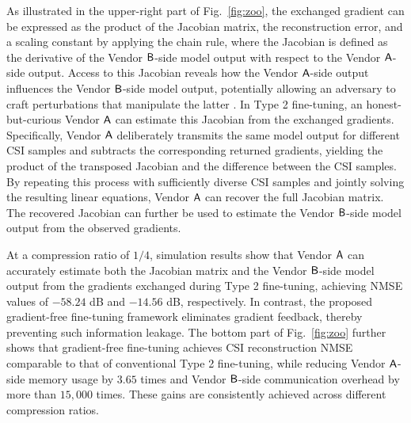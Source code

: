 \documentclass[10pt,twocolumn]{IEEEtran}
\begin{document}
As illustrated in the upper-right part of Fig.~\ref{fig:zoo}, the exchanged gradient can be expressed as the product of the Jacobian matrix, the reconstruction error, and a scaling constant by applying the chain rule, where the Jacobian is defined as the derivative of the Vendor ${\sf B}$-side model output with respect to the Vendor ${\sf A}$-side output. Access to this Jacobian reveals how the Vendor ${\sf A}$-side output influences the Vendor ${\sf B}$-side model output, potentially allowing an adversary to craft perturbations that manipulate the latter \cite{papernot2016limitations}. In Type 2 fine-tuning, an honest-but-curious Vendor ${\sf A}$ can estimate this Jacobian from the exchanged gradients. 
Specifically, Vendor ${\sf A}$ deliberately transmits the same model output for different CSI samples and subtracts the corresponding returned gradients, yielding the product of the transposed Jacobian and the difference between the CSI samples. By repeating this process with sufficiently diverse CSI samples and jointly solving the resulting linear equations, Vendor ${\sf A}$ can recover the full Jacobian matrix. The recovered Jacobian can further be used to estimate the Vendor ${\sf B}$-side model output from the observed gradients. 



%

At a compression ratio of $1/4$, simulation results show that Vendor ${\sf A}$ can accurately estimate both the Jacobian matrix and the Vendor ${\sf B}$-side model output from the gradients exchanged during Type 2 fine-tuning, achieving NMSE values of $-58.24$ dB and $-14.56$ dB, respectively. In contrast, the proposed gradient-free fine-tuning framework eliminates gradient feedback, thereby preventing such information leakage. The bottom part of Fig.~\ref{fig:zoo} further shows that gradient-free fine-tuning achieves CSI reconstruction NMSE comparable to that of conventional Type 2 fine-tuning, while reducing Vendor ${\sf A}$-side memory usage by $3.65$ times and Vendor ${\sf B}$-side communication overhead by more than $15,000$ times. These gains are consistently achieved across different compression ratios.
\end{document}
